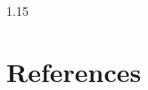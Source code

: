\documentclass[preprint,12pt]{elsarticle}
\begin{document}
\begin{spacing}{1.15}

\section*{References}%


\end{spacing}
\end{document}
